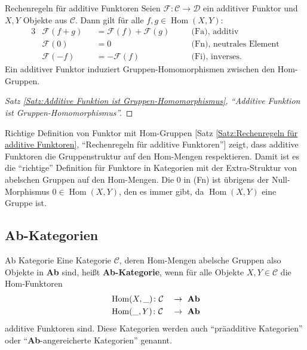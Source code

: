 \documentclass[a4paper]{amsart}
\theoremstyle{definition}
\newcommand{\myRef}[2]{[#1 \ref{#1:#2}, ``#2'']}
\DeclareMathOperator{\Hom}{Hom}
\newcommand{\CC}{\ensuremath{\mathcal{ C }}}
\newcommand{\DD}{\ensuremath{\mathcal{ D }}}
\newcommand{\FF}{\ensuremath{\mathcal{ F }}}
\begin{document}
\begin{Satz}{Rechenregeln für additive Funktoren}
   Seien $\FF \colon \CC \to \DD$ ein additiver Funktor und $X,Y$ Objekte aus $\CC$. Dann gilt für alle $f,g \in \Hom( X, Y )$:
   \begin{alignat}{3}
      &\FF(f+g) &&= \FF(f) + \FF(g) && \quad \text{(Fa), additiv}\\
      &\FF(0)   &&= 0           && \quad \text{(Fn), neutrales Element}\\
      &\FF(-f)  &&= -\FF(f)       && \quad \text{(Fi), inverses}.
   \end{alignat}
   Ein additiver Funktor induziert Gruppen-Homomorphismen zwischen den Hom-Gruppen.
\end{Satz}
\begin{proof}
   \myRef{Satz}{Additive Funktion ist Gruppen-Homomorphismus}
\end{proof}

\begin{Anmerkung}{Richtige Definition von Funktor mit Hom-Gruppen}
   \myRef{Satz}{Rechenregeln für additive Funktoren} zeigt, dass additive Funktoren die Gruppenstruktur auf den Hom-Mengen respektieren. Damit ist es die "`richtige"' Definition für Funktore in Kategorien mit der Extra-Struktur von abelschen Gruppen auf den Hom-Mengen. Die $0$ in (Fn) ist übrigens der Null-Morphismus $0 \in \Hom( X, Y )$, den es immer gibt, da $\Hom( X, Y )$ eine Gruppe ist.
\end{Anmerkung}

\subsection{\textbf{Ab}-Kategorien}
\begin{Definition}{Ab Kategorie}
   Eine Kategorie $\CC$, deren Hom-Mengen abelsche Gruppen also Objekte in \textbf{Ab} sind, heißt \textbf{Ab-Kategorie}, wenn für alle Objekte $X, Y \in \CC$ die Hom-Funktoren
   \begin{alignat}{2}
      &\Hom( X, \_ ) \colon \CC &&\to \text{ \textbf{Ab}}\\
      &\Hom( \_, Y ) \colon \CC &&\to \text{ \textbf{Ab}}
   \end{alignat}
   additive Funktoren sind. Diese Kategorien werden auch "`präadditive Kategorien"' oder "`\textbf{Ab}-angereicherte Kategorien"' genannt.
\end{Definition} 
\end{document}
